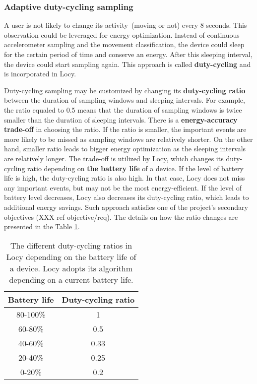 \subsubsection{Adaptive duty-cycling sampling}
\label{s:design:locy:adaptive}
\hspace{10pt}A user is not likely to change its activity\ (moving or not) every 8 seconds. This observation could be leveraged for energy optimization. Instead of continuous accelerometer sampling and the movement classification, the device could sleep for the certain period of time and conserve an energy. After this sleeping interval, the device could start sampling again. This approach is called \textbf{duty-cycling} and is incorporated in Locy. 

Duty-cycling sampling may be customized by changing its \textbf{duty-cycling ratio} between the duration of sampling windows and sleeping intervals. For example, the ratio equaled to 0.5 means that the duration of sampling windows is twice smaller than the duration of sleeping intervals. There is a \textbf{energy-accuracy trade-off} in choosing the ratio. If the ratio is smaller, the important events are more likely to be missed as sampling windows are relatively shorter. On the other hand, smaller ratio leads to bigger energy optimization as the sleeping intervals are relatively longer. The trade-off is utilized by Locy, which changes its duty-cycling ratio depending on \textbf{the battery life} of a device. If the level of battery life is high, the duty-cycling ratio is also high. In that case, Locy does not miss any important events, but may not be the most energy-efficient. If the level of battery level decreases, Locy also decreases its duty-cycling ratio, which leads to additional energy savings. Such approach satisfies one of the project's secondary objectives (XXX ref objective/req). The details on how the ratio changes are presented in the Table \ref{table:locy:dutycyclingratio}.

\begin{table}[H]
	\centering
    \begin{tabular}{| c | c | }
    \hline
    Battery life & Duty-cycling ratio \\ \hline
    80-100\% & 1 \\ \hline
    60-80\% & 0.5\\ \hline
    40-60\% & 0.33\\ \hline
    20-40\% & 0.25\\ \hline
    0-20\% & 0.2 \\ \hline
    \end{tabular}
    \caption{The different duty-cycling ratios in Locy depending on the battery life of a device. Locy adopts its algorithm depending on a current battery life. }
	\label{table:locy:dutycyclingratio}
\end{table}	

